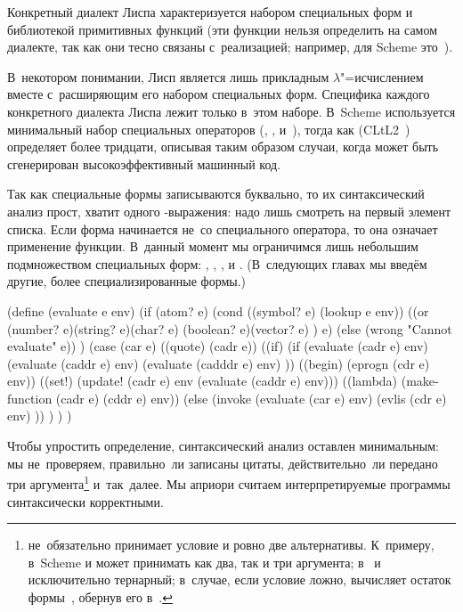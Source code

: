 Конкретный диалект Лиспа характеризуется набором специальных форм и библиотекой
примитивных функций (эти функции нельзя определить на самом диалекте, так как
они тесно связаны с~реализацией; например, для Scheme это~).

В~некотором понимании, Лисп является лишь прикладным $\lambda$"=исчислением
вместе с~расширяющим его набором специальных форм. Специфика каждого конкретного
диалекта Лиспа лежит только в~этом наборе. В~Scheme используется минимальный
набор специальных операторов (, ,  и~),
тогда как {\CommonLisp} (CLtL2~\cite{ste90}) определяет более тридцати, описывая
таким образом случаи, когда может быть сгенерирован высокоэффективный машинный
код.

Так как специальные формы записываются буквально, то их синтаксический анализ
прост, хватит одного -выражения: надо лишь смотреть на первый элемент
списка. Если форма начинается не~со специального оператора, то она означает
применение функции. В~данный момент мы ограничимся лишь небольшим подмножеством
специальных форм: , , ,  и .
(В~следующих главах мы введём другие, более специализированные формы.)


\begin{code:lisp}
(define (evaluate e env)
  (if (atom? e)
      (cond ((symbol? e) (lookup e env))
            ((or (number? e)(string? e)(char? e)
                 (boolean? e)(vector? e) ) e)
            (else (wrong "Cannot evaluate" e)) )
      (case (car e)
        ((quote)  (cadr e))
        ((if)     (if (evaluate (cadr e) env)
                      (evaluate (caddr e) env)
                      (evaluate (cadddr e) env) ))
        ((begin)  (eprogn (cdr e) env))
        ((set!)   (update! (cadr e) env (evaluate (caddr e) env)))
        ((lambda) (make-function (cadr e) (cddr e) env))
        (else     (invoke (evaluate (car e) env)
                          (evlis (cdr e) env) )) ) ) )
\end{code:lisp}


Чтобы упростить определение, синтаксический анализ оставлен минимальным: мы
не~проверяем, правильно~ли записаны цитаты, действительно~ли  передано
три аргумента\footnote{ не~обязательно принимает условие и ровно две
альтернативы. К~примеру, в~Scheme и {\CommonLisp}  может принимать как
два, так и три аргумента;  в~{\EuLisp} и {\ISLisp} исключительно
тернарный; {\LeLisp} в~случае, если условие ложно, вычисляет остаток
формы~, обернув его в~.} и~так~далее. Мы априори считаем
интерпретируемые программы синтаксически корректными.


